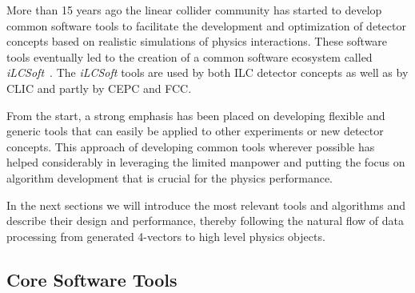 %
%
\newcommand{\fix}[1]{\textcolor{red}{\texttt{#1}}} %

\newcommand{\CPP}{C\nolinebreak\hspace{-.05em}\raisebox{.4ex}{\tiny\bf +}\nolinebreak\hspace{-.10em}\raisebox{.4ex}{\tiny\bf +}}


More than 15 years ago the linear collider community has started to develop common software
tools to facilitate the development and optimization of detector concepts based on realistic
simulations of physics interactions. These software tools eventually led to the creation of
a common software ecosystem called \emph{iLCSoft}~\cite{bib:ilcsoft}.
The \emph{iLCSoft} tools are used by both ILC detector concepts as well as by CLIC
and partly by CEPC and FCC.

From the start, a strong emphasis has been placed on developing flexible and generic tools
that can easily be applied to other experiments or new detector concepts. 
This approach of developing common tools wherever possible has helped considerably in
leveraging the limited manpower and putting the focus on algorithm development that
is crucial for the physics performance. 

In the next sections we will introduce the most relevant tools and algorithms and
describe their design and performance, thereby following the natural flow of data processing
from generated 4-vectors to high level physics objects.


\subsection{\label{sub:sw-core-tools}Core Software Tools}

